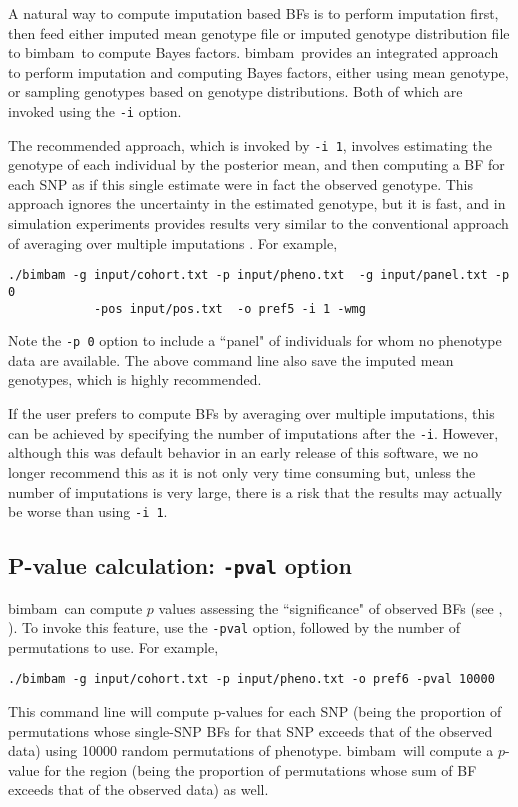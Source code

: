 \documentclass[11pt,Palatino]{article}
\def\bimbam{{\sc bimbam}~}
\begin{document}
A natural way to compute imputation based BFs is to perform imputation first, then feed either imputed mean genotype file or imputed genotype distribution file to \bimbam to compute Bayes factors.  
\bimbam provides an integrated approach to perform imputation and computing Bayes factors,  either using mean genotype, or sampling genotypes based on genotype distributions.  
Both of which are invoked using the {\tt -i} option.

The recommended approach, which is invoked by {\tt -i 1}, involves estimating the genotype of each individual by the posterior mean, and then computing a BF for each SNP as if this single estimate were in fact the observed genotype. This approach ignores the uncertainty in the estimated genotype, but it is fast, and in simulation experiments provides results very similar to the conventional approach of averaging over multiple imputations \cite{guan.stephens.08}. For example,
\begin{verbatim}
./bimbam -g input/cohort.txt -p input/pheno.txt  -g input/panel.txt -p 0  
            -pos input/pos.txt  -o pref5 -i 1 -wmg
\end{verbatim}
Note the {\tt -p 0} option to include a ``panel" of individuals for whom no phenotype data are available. The above command line also save the imputed mean genotypes, which is highly recommended. 


If the user prefers to compute BFs by averaging over multiple imputations, this can be achieved by specifying the number of imputations after the {\tt -i}. 
However, although this was default behavior in an early release of this software, we no longer recommend this as it is not only very time consuming but, unless the number of imputations is very large, there is a risk that the results may actually  be worse than using {\tt -i 1}.   



\subsection{P-value calculation: {\tt -pval} option}

\bimbam can compute $p$ values assessing the ``significance" of observed BFs (see \citeauthor{servin.stephens.07}, \citeyear{servin.stephens.07}).
To invoke this feature, use the {\tt -pval} option, followed by the number of permutations to use.
For example,
\begin{verbatim}
./bimbam -g input/cohort.txt -p input/pheno.txt -o pref6 -pval 10000
\end{verbatim}
This command line will compute p-values for each SNP (being the proportion of permutations whose single-SNP BFs for that SNP exceeds that of the observed data) using 10000 random permutations of phenotype.
\bimbam will compute a $p$-value for the region (being the
proportion of permutations whose sum of BF exceeds that of the observed data) as well. 
\end{document}
